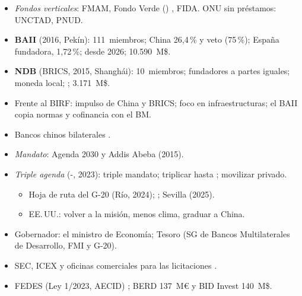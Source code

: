 \documentclass{article}
\begin{document}
\begin{columnas}
\begin{itemize}
\item \emph{Fondos verticales}: FMAM, Fondo Verde () , FIDA. ONU sin préstamos: UNCTAD, PNUD.
\end{itemize}
\begin{itemize}
\item \textbf{BAII} (2016, Pekín): 111~miembros; China 26,4\,\% y veto (75\,\%); España fundadora, 1,72\,\%;  desde 2026; 10.590~M\$.
\item \textbf{NDB} (BRICS, 2015, Shanghái): 10~miembros; fundadores a partes iguales; moneda local; ; 3.171~M\$.
\item Frente al BIRF: impulso de China y BRICS; foco en infraestructuras; el BAII copia normas y cofinancia con el BM.
\item Bancos chinos bilaterales .
\end{itemize}
\begin{itemize}
\item \emph{Mandato}: Agenda 2030 y Addis Abeba (2015).
\item \emph{Triple agenda} (-, 2023): triple mandato; triplicar hasta ; movilizar privado.
  \begin{itemize}
  \item Hoja de ruta del G-20 (Río, 2024); ; Sevilla (2025).
  \item EE.\,UU.: volver a la misión, menos clima, graduar a China.
  \end{itemize}
\end{itemize}
\begin{itemize}
\item Gobernador: el ministro de Economía; Tesoro (SG de Bancos Multilaterales de Desarrollo, FMI y G-20).
\item SEC, ICEX y oficinas comerciales para las licitaciones .
\item FEDES (Ley 1/2023, AECID) ; BERD 137~M€ y BID Invest 140~M\$.
\end{itemize}


\end{columnas}
\end{document}
